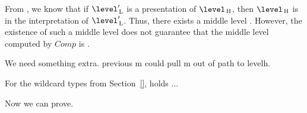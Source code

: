 From , we know that if $\level'\L$ is a presentation of $\level\H$, then $\level\H$ is in the interpretation of $\level'\L$. Thus, there exists a middle level . However, the existence of such a middle level does not guarantee that the middle level computed by $Comp$ is . 

We need something extra. previous m could pull m out of path to levelh.

%
%
%



For the wildcard types from Section~\ref{},  holds ...

Now we can prove. 




